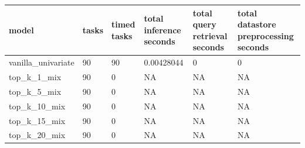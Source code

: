 \begin{tabular}{llllll}
\toprule
model & tasks & timed tasks & total inference seconds & total query retrieval seconds & total datastore preprocessing seconds \\
\midrule
vanilla\_univariate & 90 & 90 & 0.00428044 & 0 & 0 \\
top\_k\_1\_mix & 90 & 0 & NA & NA & NA \\
top\_k\_5\_mix & 90 & 0 & NA & NA & NA \\
top\_k\_10\_mix & 90 & 0 & NA & NA & NA \\
top\_k\_15\_mix & 90 & 0 & NA & NA & NA \\
top\_k\_20\_mix & 90 & 0 & NA & NA & NA \\
\bottomrule
\end{tabular}
